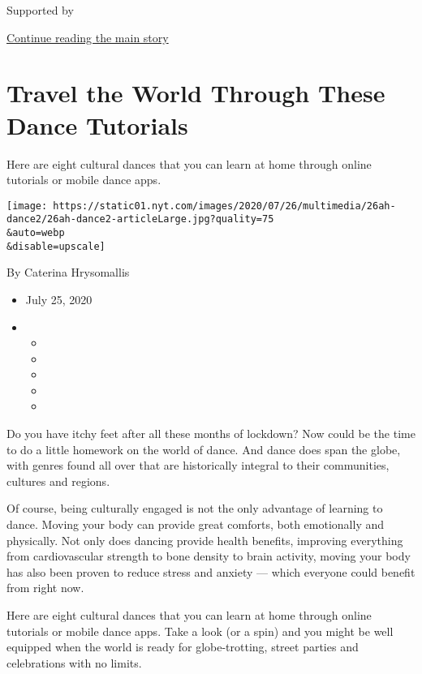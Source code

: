 Supported by

\protect\hyperlink{after-sponsor}{Continue reading the main story}

\hypertarget{travel-the-world-through-these-dance-tutorials}{%
\section{Travel the World Through These Dance
Tutorials}\label{travel-the-world-through-these-dance-tutorials}}

Here are eight cultural dances that you can learn at home through online
tutorials or mobile dance apps.

\texttt{[image: https://static01.nyt.com/images/2020/07/26/multimedia/26ah-dance2/26ah-dance2-articleLarge.jpg?quality=75\\\&auto=webp\\\&disable=upscale]}

By Caterina Hrysomallis

\begin{itemize}
\item
  July 25, 2020
\item
  \begin{itemize}
  \item
  \item
  \item
  \item
  \item
  \end{itemize}
\end{itemize}

Do you have itchy feet after all these months of lockdown? Now could be
the time to do a little homework on the world of dance. And dance does
span the globe, with genres found all over that are historically
integral to their communities, cultures and regions.

Of course, being culturally engaged is not the only advantage of
learning to dance. Moving your body can provide great comforts, both
emotionally and physically. Not only does dancing provide health
benefits, improving everything from cardiovascular strength to bone
density to brain activity, moving your body has also been proven to
reduce stress and anxiety --- which everyone could benefit from right
now.

Here are eight cultural dances that you can learn at home through online
tutorials or mobile dance apps. Take a look (or a spin) and you might be
well equipped when the world is ready for globe-trotting, street parties
and celebrations with no limits.

